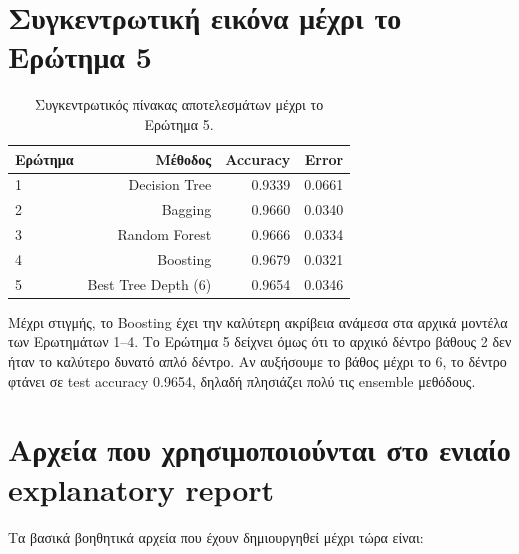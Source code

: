 \documentclass[12pt,a4paper]{article}
\begin{document}
\section{Συγκεντρωτική εικόνα μέχρι το Ερώτημα 5}

\begin{table}[H]
\centering
\caption{Συγκεντρωτικός πίνακας αποτελεσμάτων μέχρι το Ερώτημα 5.}
\begin{tabular}{lrrr}
\toprule
\textbf{Ερώτημα} & \textbf{Μέθοδος} & \textbf{Accuracy} & \textbf{Error} \\
\midrule
1 & Decision Tree & 0.9339 & 0.0661 \\
2 & Bagging & 0.9660 & 0.0340 \\
3 & Random Forest & 0.9666 & 0.0334 \\
4 & Boosting & 0.9679 & 0.0321 \\
5 & Best Tree Depth (6) & 0.9654 & 0.0346 \\
\bottomrule
\end{tabular}
\end{table}

Μέχρι στιγμής, το Boosting έχει την καλύτερη ακρίβεια ανάμεσα στα αρχικά
μοντέλα των Ερωτημάτων 1--4. Το Ερώτημα 5 δείχνει όμως ότι το αρχικό δέντρο
βάθους 2 δεν ήταν το καλύτερο δυνατό απλό δέντρο. Αν αυξήσουμε το βάθος μέχρι
το 6, το δέντρο φτάνει σε test accuracy 0.9654, δηλαδή πλησιάζει πολύ τις
ensemble μεθόδους.

\appendix
\section{Αρχεία που χρησιμοποιούνται στο ενιαίο explanatory report}

Τα βασικά βοηθητικά αρχεία που έχουν δημιουργηθεί μέχρι τώρα είναι:
\end{document}
